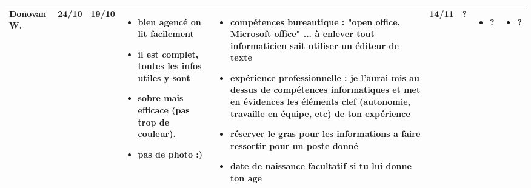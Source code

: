 \documentclass[a4paper,11pt]{article}
\begin{document}
\begin{landscape}
\begin{longtable}{|l|l|l|p{4cm}|p{4cm}|l|l|p{4cm}|p{4cm}|}
    Donovan W. 	& 24/10 & 19/10 %
    			& \begin{itemize}
				  \item bien agencé on lit facilement
				  \item il est complet, toutes les infos utiles y sont
				  \item sobre mais efficace (pas trop de couleur).
				  \item pas de photo :)
				  \end{itemize}
				& \begin{itemize}
				  \item compétences bureautique : "open office, Microsoft office" ... à enlever tout informaticien sait utiliser un éditeur de texte
				  \item expérience professionnelle : je l'aurai mis au dessus de compétences informatiques et met en évidences les éléments clef (autonomie, travaille en équipe, etc) de ton expérience
				  \item réserver le gras pour les informations a faire ressortir pour un poste donné
				  \item date de naissance facultatif si tu lui donne ton age
				  \end{itemize} 
    			& 14/11 & ?
    			& \begin{itemize}
				  \item ?
				  \end{itemize}
			    & \begin{itemize}
				  \item ?
				  \end{itemize} \\ \hline 


\end{longtable}
\end{landscape}
\end{document}
